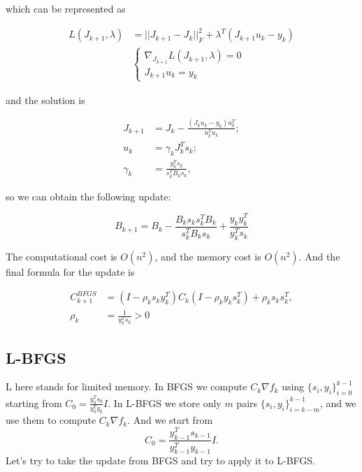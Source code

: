 which can be represented as 

\begin{equation*}
    \begin{aligned}
        L(J_{k+1}, \lambda) &= ||J_{k+1} - J_k||^2_F + \lambda^T (J_{k+1} u_k - y_k) \\ 
        &\begin{cases}
            \nabla_{J_{k+1}} L (J_{k+1}, \lambda) = 0 \\
            J_{k+1} u_k = y_k
        \end{cases}
    \end{aligned}
\end{equation*}

and the solution is

\begin{equation*}
    \begin{aligned}
        J_{k+1} &= J_k - \frac{(J_k u_k - y_k) u_k^T}{u_k^T u_k}; \\
        u_k &= \gamma_k J_k^T s_k; \\ 
        \gamma_k &= \frac{y_k^T s_k}{s_k^T B_k s_k},
    \end{aligned}
\end{equation*}

so we can obtain the following update:

\begin{equation*}
    \boxed{B_{k+1} = B_k - \frac{B_k s_k s_k^T B_k}{s_k^T B_k s_k} + \frac{y_k y_k^T}{y_k^T s_k}}
\end{equation*}

The computational cost is $O(n^2)$, and the memory cost is $O(n^2)$. And the final formula for the update is

\begin{equation*}
    \begin{aligned}
        C_{k+1}^{BFGS} &= \left( I - \rho_k s_k y_k^T \right) C_k \left( I - \rho_k y_k s_k^T \right) + \rho_k s_k s_k^T, \\
        \rho_k &= \frac{1}{y_k^T s_k} > 0
    \end{aligned}
\end{equation*}

\subsection{L-BFGS}

L here stands for limited memory. In BFGS we compute $C_k \nabla f_k$ using $\{s_i, y_i\}_{i = 0}^{k-1}$ starting from $C_0 = \frac{y_0^T s_0}{y_0^T y_0} I$. In L-BFGS we store only $m$ pairs $\{s_i, y_i\}_{i = k-m}^{k-1}$, and we use them to compute $C_k \nabla f_k$. And we start from $$C_0 = \frac{y_{k-1}^T s_{k-1}}{y_{k-1}^T y_{k-1}} I.$$ Let's try to take the update from BFGS and try to apply it to L-BFGS.

